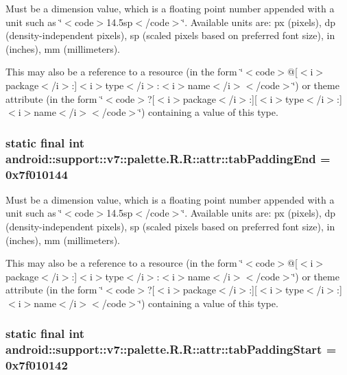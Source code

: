 Must be a dimension value, which is a floating point number appended with a unit such as \char`\"{}$<$code$>$14.5sp$<$/code$>$\char`\"{}. Available units are: px (pixels), dp (density-independent pixels), sp (scaled pixels based on preferred font size), in (inches), mm (millimeters). 

This may also be a reference to a resource (in the form \char`\"{}$<$code$>$@\mbox{[}$<$i$>$package$<$/i$>$:\mbox{]}$<$i$>$type$<$/i$>$:$<$i$>$name$<$/i$>$$<$/code$>$\char`\"{}) or theme attribute (in the form \char`\"{}$<$code$>$?\mbox{[}$<$i$>$package$<$/i$>$:\mbox{]}\mbox{[}$<$i$>$type$<$/i$>$:\mbox{]}$<$i$>$name$<$/i$>$$<$/code$>$\char`\"{}) containing a value of this type. \hypertarget{classandroid_1_1support_1_1v7_1_1palette_1_1_r_1_1attr_675dfc781b47a679d0ea48ef1c858b83}{
\subsubsection[{tabPaddingEnd}]{\setlength{\rightskip}{0pt plus 5cm}static final int android::support::v7::palette.R.R::attr::tabPaddingEnd = 0x7f010144}}
\label{classandroid_1_1support_1_1v7_1_1palette_1_1_r_1_1attr_675dfc781b47a679d0ea48ef1c858b83}


Must be a dimension value, which is a floating point number appended with a unit such as \char`\"{}$<$code$>$14.5sp$<$/code$>$\char`\"{}. Available units are: px (pixels), dp (density-independent pixels), sp (scaled pixels based on preferred font size), in (inches), mm (millimeters). 

This may also be a reference to a resource (in the form \char`\"{}$<$code$>$@\mbox{[}$<$i$>$package$<$/i$>$:\mbox{]}$<$i$>$type$<$/i$>$:$<$i$>$name$<$/i$>$$<$/code$>$\char`\"{}) or theme attribute (in the form \char`\"{}$<$code$>$?\mbox{[}$<$i$>$package$<$/i$>$:\mbox{]}\mbox{[}$<$i$>$type$<$/i$>$:\mbox{]}$<$i$>$name$<$/i$>$$<$/code$>$\char`\"{}) containing a value of this type. \hypertarget{classandroid_1_1support_1_1v7_1_1palette_1_1_r_1_1attr_cb834b02d94e79ae0aa89ed28b6382fd}{
\subsubsection[{tabPaddingStart}]{\setlength{\rightskip}{0pt plus 5cm}static final int android::support::v7::palette.R.R::attr::tabPaddingStart = 0x7f010142}}
\label{classandroid_1_1support_1_1v7_1_1palette_1_1_r_1_1attr_cb834b02d94e79ae0aa89ed28b6382fd}



